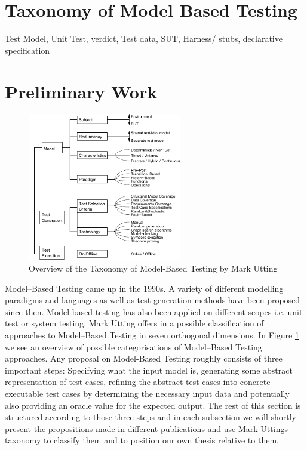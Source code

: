\section{Taxonomy of Model Based Testing}
Test Model,
Unit Test,
verdict,
Test data,
SUT,
Harness/ stubs,
declarative specification

\section{Preliminary Work}
\label{sec:RelatedWork}
\begin{figure}
\includegraphics[width=0.6\textwidth]{./pics/taxonomyOfMBT.pdf}
\caption{Overview of the Taxonomy of Model-Based Testing by Mark Utting \cite{utting2006taxonomy}}
\label{fig:UttingTaxonomy}
\end{figure}
 Model--Based Testing came up in the 1990s. A variety of different modelling paradigms and languages as well as test generation methods have been proposed since then. Model based testing has also been applied on different scopes i.e. unit test or system testing. Mark Utting offers in \cite{utting2006taxonomy} a possible classification of approaches to Model--Based Testing in seven orthogonal dimensions. In Figure \ref{fig:UttingTaxonomy} we see an overview of possible categorisations of Model--Based Testing approaches. Any proposal on Model-Based Testing roughly consists of three important steps: Specifying what the input model is, generating some abstract representation of test cases, refining the abstract test cases into concrete executable test cases by determining the necessary input data and potentially also providing an oracle value for the expected output. The rest of this section is structured according to those three steps and in each subsection we will shortly present the propositions made in different publications and use Mark Uttings taxonomy to classify them and to position our own thesis relative to them.
% 
